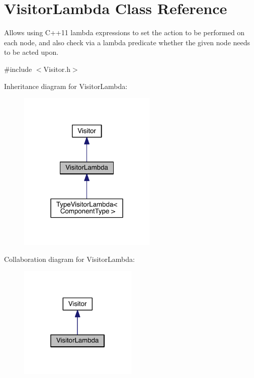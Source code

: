 \hypertarget{classVisitorLambda}{\section{Visitor\+Lambda Class Reference}
\label{classVisitorLambda}
}


Allows using C++11 lambda expressions to set the action to be performed on each node, and also check via a lambda predicate whether the given node needs to be acted upon.  




{\ttfamily \#include $<$Visitor.\+h$>$}



Inheritance diagram for Visitor\+Lambda\+:\nopagebreak
\begin{figure}[H]
\begin{center}
\leavevmode
\includegraphics[width=187pt]{classVisitorLambda__inherit__graph}
\end{center}
\end{figure}


Collaboration diagram for Visitor\+Lambda\+:\nopagebreak
\begin{figure}[H]
\begin{center}
\leavevmode
\includegraphics[width=160pt]{classVisitorLambda__coll__graph}
\end{center}
\end{figure}
